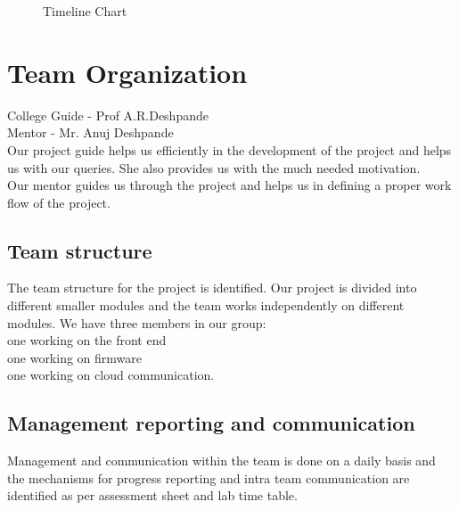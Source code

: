 \documentclass[oneside,a4paper,12pt]{report}
\begin{document}
\begin{center}
	\begin{figure}[!htbp]
		\centering
	  \caption{Timeline Chart}
	  \label{fig:act-dig}
	\end{figure}
\end{center}  



 
\section{Team Organization}
College Guide - Prof A.R.Deshpande\\
Mentor - Mr. Anuj Deshpande \\

Our project guide helps us efficiently in the development of the project and helps us with our queries.
She also provides us with the much needed motivation.\\
Our mentor guides us through the project and helps us in defining a proper work flow of the project.\\ 

\subsection{Team structure}
The team structure for the project is identified.
Our project is divided into different smaller modules and the team works independently on  different modules.
We have three members in our group:\\
one working on the front end\\
one working on firmware\\
one working on cloud communication.\\

\subsection{Management reporting and communication}
Management and communication within the team is done on a daily basis and the mechanisms for progress reporting and intra team communication are identified as per assessment sheet and lab time table.
\end{document}
